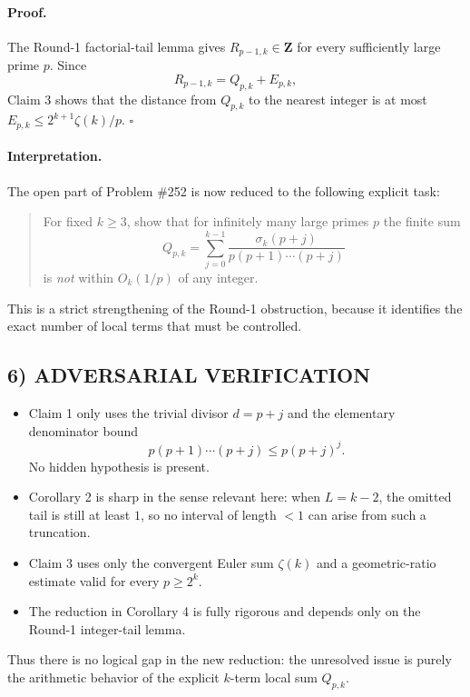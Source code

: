 \paragraph{Proof.}
The Round-1 factorial-tail lemma gives $R_{p-1,k}\in\mathbf{Z}$ for every sufficiently large prime $p$. Since
\[
R_{p-1,k}=Q_{p,k}+E_{p,k},
\]
Claim 3 shows that the distance from $Q_{p,k}$ to the nearest integer is at most $E_{p,k}\le 2^{k+1}\zeta(k)/p$.
\hfill$\square$

\medskip

\paragraph{Interpretation.}
The open part of Problem \#252 is now reduced to the following explicit task:

\begin{quote}
For fixed $k\ge 3$, show that for infinitely many large primes $p$ the finite sum
\[
Q_{p,k}=\sum_{j=0}^{k-1}\frac{\sigma_k(p+j)}{p(p+1)\cdots(p+j)}
\]
is \emph{not} within $O_k(1/p)$ of any integer.
\end{quote}

This is a strict strengthening of the Round-1 obstruction, because it identifies the exact number of local terms that must be controlled.

\subsection*{6) ADVERSARIAL VERIFICATION}

\begin{itemize}
\item Claim 1 only uses the trivial divisor $d=p+j$ and the elementary denominator bound
\[
p(p+1)\cdots(p+j)\le p(p+j)^j.
\]
No hidden hypothesis is present.
\item Corollary 2 is sharp in the sense relevant here: when $L=k-2$, the omitted tail is still at least $1$, so no interval of length $<1$ can arise from such a truncation.
\item Claim 3 uses only the convergent Euler sum $\zeta(k)$ and a geometric-ratio estimate valid for every $p\ge 2^k$.
\item The reduction in Corollary 4 is fully rigorous and depends only on the Round-1 integer-tail lemma.
\end{itemize}

Thus there is no logical gap in the new reduction: the unresolved issue is purely the arithmetic behavior of the explicit $k$-term local sum $Q_{p,k}$.

